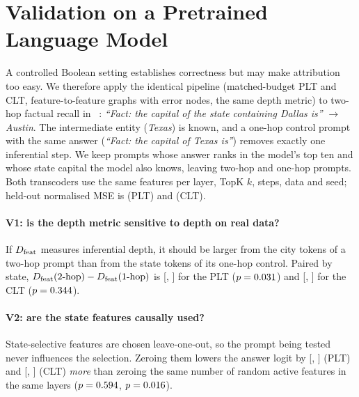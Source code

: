 \section{Validation on a Pretrained Language Model}\label{sec:realdata}
A controlled Boolean setting establishes correctness but may make attribution too easy. We therefore apply the
identical pipeline (matched-budget PLT and CLT, feature-to-feature graphs with error nodes, the same depth
metric) to two-hop factual recall in \LMModel{}~\cite{lindsey2025biology}:
\emph{``Fact: the capital of the state containing Dallas is''} $\to$ \emph{Austin}. The intermediate entity
(\emph{Texas}) is known, and a one-hop control prompt with the same answer
(\emph{``Fact: the capital of Texas is''}) removes exactly one inferential step. We keep prompts whose answer
ranks in the model's top ten and whose state capital the model also knows, leaving \LMNTwoHop{} two-hop and
\LMNOneHop{} one-hop prompts. Both transcoders use the same features per layer, TopK $k$, steps, data and seed;
held-out normalised MSE is \LMNMSEPLT{} (PLT) and \LMNMSECLT{} (CLT).

\paragraph{V1: is the depth metric sensitive to depth on real data?}
If $D_{\mathrm{feat}}$ measures inferential depth, it should be larger from the city tokens of a two-hop prompt than from
the state tokens of its one-hop control. Paired by state, $D_{\mathrm{feat}}(\text{2-hop})-D_{\mathrm{feat}}(\text{1-hop})$ is
\LMVOnePLT{} [\LMVOneLoPLT{}, \LMVOneHiPLT{}] for the PLT ($p=0.031$) and
\LMVOneCLT{} [\LMVOneLoCLT{}, \LMVOneHiCLT{}] for the CLT ($p=0.344$).

\paragraph{V2: are the state features causally used?}
State-selective features are chosen leave-one-out, so the prompt being tested never influences the selection.
Zeroing them lowers the answer logit by \LMVTwoPLT{} [\LMVTwoLoPLT{}, \LMVTwoHiPLT{}] (PLT) and
\LMVTwoCLT{} [\LMVTwoLoCLT{}, \LMVTwoHiCLT{}] (CLT) \emph{more} than zeroing the same number of random active
features in the same layers ($p=0.594$, $p=0.016$).

